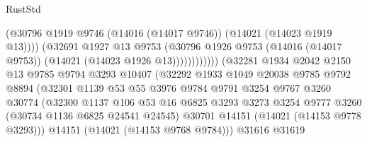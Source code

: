 \begin{lexlean}{RustStd}
\begin{coremodule}
                                            (@30796
                                              @1919
                                              @9746
                                              (@14016 (@14017 @9746))
                                              (@14021 (@14023 @1919 @13))))
                                          (@32691
                                            @1927
                                            @13
                                            @9753
                                            (@30796
                                              @1926
                                              @9753
                                              (@14016 (@14017 @9753))
                                              (@14021 (@14023 @1926 @13))))))))))))
                          (@32281
                            @1934
                            @2042
                            @2150
                            @13
                            @9785
                            @9794
                            @3293
                            @10407
                            (@32292
                              @1933
                              @1049
                              @20038
                              @9785
                              @9792
                              @8894
                              (@32301
                                @1139
                                @53
                                @55
                                @3976
                                @9784
                                @9791
                                @3254
                                @9767
                                @3260
                                @30774
                                (@32300
                                  @1137
                                  @106
                                  @53
                                  @16
                                  @6825
                                  @3293
                                  @3273
                                  @3254
                                  @9777
                                  @3260
                                  (@30734 @1136 @6825 @24541 @24545)
                                  @30701
                                  @14151
                                  (@14021 (@14153 @9778 @3293)))
                                @14151
                                (@14021 (@14153 @9768 @9784)))
                              @31616
                              @31619

\end{coremodule}
\end{lexlean}
